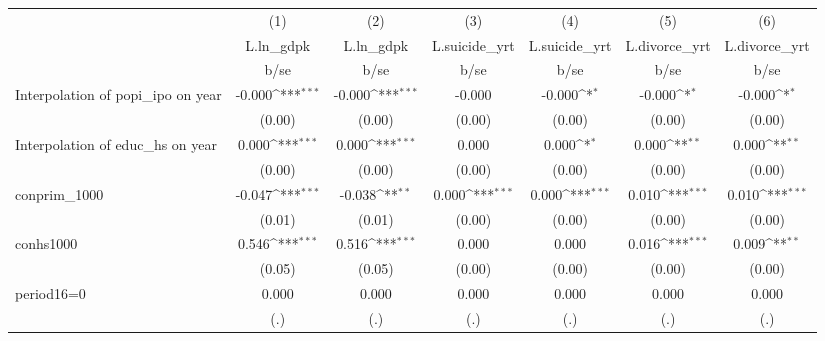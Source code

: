 {
\def\sym#1{\ifmmode^{#1}\else\(^{#1}\)\fi}
\begin{tabular}{l*{6}{c}}
\hline\hline
                    &\multicolumn{1}{c}{(1)}&\multicolumn{1}{c}{(2)}&\multicolumn{1}{c}{(3)}&\multicolumn{1}{c}{(4)}&\multicolumn{1}{c}{(5)}&\multicolumn{1}{c}{(6)}\\
                    &\multicolumn{1}{c}{L.ln\_gdpk}&\multicolumn{1}{c}{L.ln\_gdpk}&\multicolumn{1}{c}{L.suicide\_yrt}&\multicolumn{1}{c}{L.suicide\_yrt}&\multicolumn{1}{c}{L.divorce\_yrt}&\multicolumn{1}{c}{L.divorce\_yrt}\\
                    &        b/se         &        b/se         &        b/se         &        b/se         &        b/se         &        b/se         \\
\hline
Interpolation of popi\_ipo on year&      -0.000\sym{***}&      -0.000\sym{***}&      -0.000         &      -0.000\sym{*}  &      -0.000\sym{*}  &      -0.000\sym{*}  \\
                    &      (0.00)         &      (0.00)         &      (0.00)         &      (0.00)         &      (0.00)         &      (0.00)         \\
Interpolation of educ\_hs on year&       0.000\sym{***}&       0.000\sym{***}&       0.000         &       0.000\sym{*}  &       0.000\sym{**} &       0.000\sym{**} \\
                    &      (0.00)         &      (0.00)         &      (0.00)         &      (0.00)         &      (0.00)         &      (0.00)         \\
conprim\_1000        &      -0.047\sym{***}&      -0.038\sym{**} &       0.000\sym{***}&       0.000\sym{***}&       0.010\sym{***}&       0.010\sym{***}\\
                    &      (0.01)         &      (0.01)         &      (0.00)         &      (0.00)         &      (0.00)         &      (0.00)         \\
conhs1000           &       0.546\sym{***}&       0.516\sym{***}&       0.000         &       0.000         &       0.016\sym{***}&       0.009\sym{**} \\
                    &      (0.05)         &      (0.05)         &      (0.00)         &      (0.00)         &      (0.00)         &      (0.00)         \\
period16=0          &       0.000         &       0.000         &       0.000         &       0.000         &       0.000         &       0.000         \\
                    &         (.)         &         (.)         &         (.)         &         (.)         &         (.)         &         (.)         \\

\end{tabular}}
